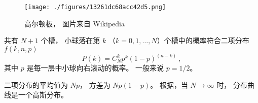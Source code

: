 
\begin{issues}
\issueDraft
\end{issues}


\begin{figure}[ht]
\centering
\texttt{[image: ./figures/13261dc68acc42d5.png]}
\caption{高尔顿板， 图片来自 Wikipedia} \label{fig_Galton_1}
\end{figure}

共有 $N+1$ 个槽， 小球落在第 $k$ （$k = 0,1,\dots,N$）个槽中的概率符合二项分布 $f(k,n,p)$
\begin{equation}
P(k) = C_N^k p^k (1-p)^{(n-k)}~,
\end{equation}
其中 $p$ 是每一层中小球向右滚动的概率。 一般来说 $p = 1/2$。

二项分布的平均值为 $Np$， 方差为 $Np(1-p)$。 根据，当 $N\to\infty$ 时， 分布曲线是一个高斯分布。
